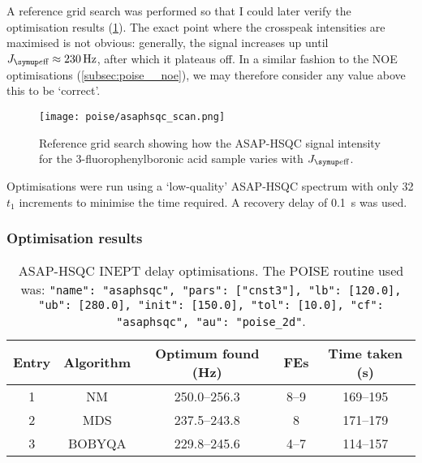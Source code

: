 A reference grid search was performed so that I could later verify the optimisation results (\cref{fig:asaphsqc_scan}).
The exact point where the crosspeak intensities are maximised is not obvious: generally, the signal increases up until $\Jeff \approx \qty{230}{\Hz}$, after which it plateaus off.
In a similar fashion to the NOE optimisations (\cref{subsec:poise__noe}), we may therefore consider any value above this to be `correct'.

\begin{figure}[htb]
    \centering
    \texttt{[image: poise/asaphsqc\_scan.png]}%
    \caption[Reference grid search for ASAP-HSQC excitation delay]{
        Reference grid search showing how the ASAP-HSQC signal intensity for the 3-fluorophenylboronic acid sample varies with $\Jeff$.
    }
    \label{fig:asaphsqc_scan}
\end{figure}

Optimisations were run using a `low-quality' ASAP-HSQC spectrum with only 32 $t_1$ increments to minimise the time required.
A recovery delay of \qty{0.1}{\s} was used.

\subsubsection{Optimisation results}

\begin{table}[htb]
    \centering
    \begin{tabular}{ccccc}
        \toprule
        Entry & Algorithm & Optimum found (\unit{\Hz}) & FEs  & Time taken (\unit{\s}) \\
        \midrule
        1     & NM        & 250.0--256.3            & 8--9 & 169--195             \\
        2     & MDS       & 237.5--243.8            & 8    & 171--179             \\
        3     & BOBYQA    & 229.8--245.6            & 4--7 & 114--157             \\
        \bottomrule
    \end{tabular}
    \caption[ASAP-HSQC INEPT delay optimisations]{
        ASAP-HSQC INEPT delay optimisations.
        The POISE routine used was: \texttt{{"name": "asaphsqc", "pars": ["cnst3"], "lb": [120.0], "ub": [280.0], "init": [150.0], "tol": [10.0], "cf": "asaphsqc", "au": "poise_2d"}}.
    }
    \label{tbl:poise_asaphsqc}
\end{table}

